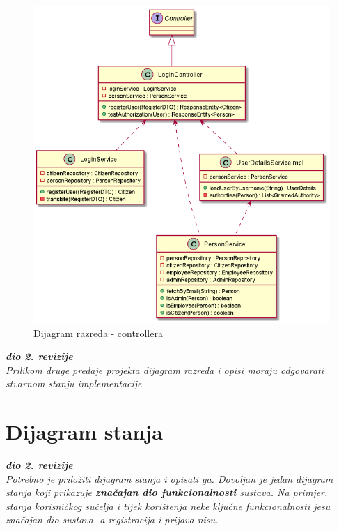 			\begin{figure}[H]
				\includegraphics[scale=0.7]{figures/ControllerClassDiagram.PNG}
				\centering
				\caption{Dijagram razreda - controllera}
				\label{fig:controller-cd}
			\end{figure}
			
			\textbf{\textit{dio 2. revizije}}\\			
			
			\textit{Prilikom druge predaje projekta dijagram razreda i opisi moraju odgovarati stvarnom stanju implementacije}

			\eject
		
		\section{Dijagram stanja}
			
			
			\textbf{\textit{dio 2. revizije}}\\
			
			\textit{Potrebno je priložiti dijagram stanja i opisati ga. Dovoljan je jedan dijagram stanja koji prikazuje \textbf{značajan dio funkcionalnosti} sustava. Na primjer, stanja korisničkog sučelja i tijek korištenja neke ključne funkcionalnosti jesu značajan dio sustava, a registracija i prijava nisu. }
			
